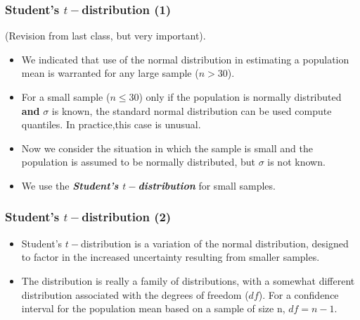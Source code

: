 \documentclass[a4]{beamer}
\begin{document}
\begin{frame}
\frametitle{Student's $t-$distribution (1)}
(Revision from last class, but very important).
\begin{itemize} \item We indicated that use of the normal distribution in estimating a population mean is warranted for any large sample ($n > 30$).

\item For a small sample ($n \leq 30$) only if the population is normally distributed \textbf{and} $\sigma$ is known, the standard normal distribution can be used compute quantiles. In practice,this case is unusual.

\item Now we consider the situation in which the sample is small and the population is assumed to be normally distributed, but $\sigma$ is not known.
\item We use the \textbf{\textit{Student's $t-$distribution}} for small samples.
\end{itemize}
\end{frame}
\begin{frame}
\frametitle{Student's $t-$distribution (2)}
\begin{itemize}
\item Student's $t-$distribution is a variation of the normal distribution, designed to factor in the increased uncertainty resulting from smaller samples.
\item The distribution is really a family of distributions, with
a somewhat different distribution associated with the degrees of freedom ($df$). For a confidence interval for the
population mean based on a sample of size n, $df = n - 1$.
\end{itemize}
\end{frame}
\end{document}
